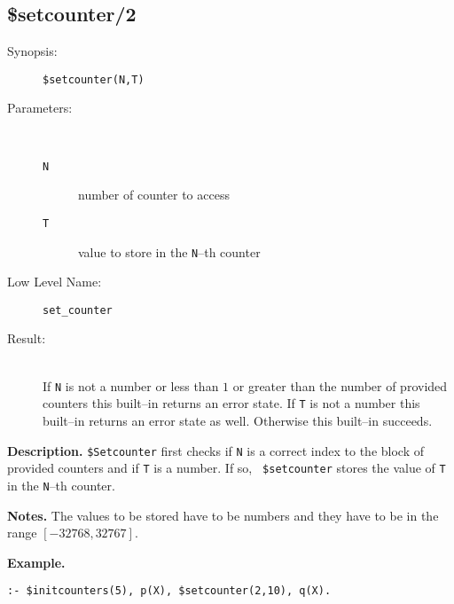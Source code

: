 %
%
%
\subsection{\$setcounter/2}

\begin{description}
\item[Synopsis:]
	{\tt \$setcounter(N,T)}
\item[Parameters:]\ \\[-0.5cm]
	\begin{description}
	\item[{\tt N}] number of counter to access
	\item[{\tt T}] value to store in the {\tt N}--th counter
	\end{description}
\item[Low Level Name:]
	{\tt set\_counter}
\item[Result:]\ \\
        If {\tt N} is not a number or less than $1$ or greater than
        the number of provided counters this built--in returns an
        error state.
        If {\tt T} is not a number this built--in returns an
        error state as well.
        Otherwise this built--in succeeds.
\end{description}

\vspace*{0.5cm}
\noindent
{\bf Description.}
{\tt \$Setcounter} first checks if {\tt N} is a correct index to the
block of provided counters and if {\tt T} is a number. If so, {\tt
\$setcounter} stores the value of {\tt T} in the {\tt N}--th counter.

\vspace*{0.5cm}
\noindent
{\bf Notes.}
The values to be stored have to be numbers and they have to be in the
range $[-32768,32767]$.

\vspace*{0.5cm}
\noindent
{\bf Example.}
\begin{verbatim}
:- $initcounters(5), p(X), $setcounter(2,10), q(X).
\end{verbatim}



